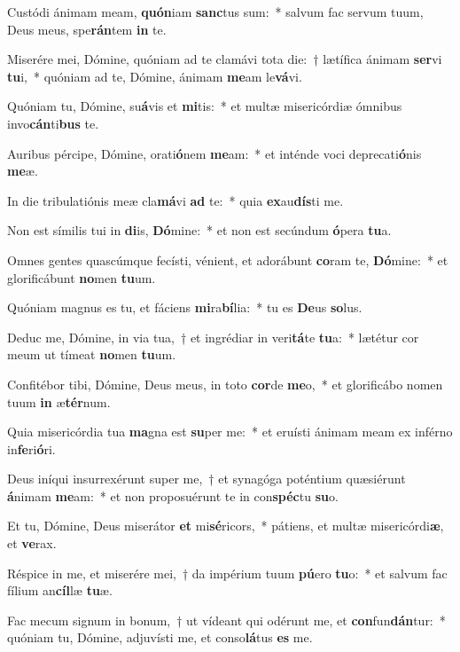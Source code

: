 \item Custódi ánimam meam, \textbf{quón}iam \textbf{sanc}tus sum:~* salvum fac servum tuum, Deus meus, spe\textbf{rán}tem \textbf{in} te.
\item Miserére mei, Dómine, quóniam ad te clamávi tota die:~† lætífica ánimam \textbf{ser}vi \textbf{tu}i,~* quóniam ad te, Dómine, ánimam \textbf{me}am le\textbf{vá}vi.
\item Quóniam tu, Dómine, su\textbf{á}vis et \textbf{mi}tis:~* et multæ misericórdiæ ómnibus invo\textbf{cán}ti\textbf{bus} te.
\item Auribus pércipe, Dómine, orati\textbf{ó}nem \textbf{me}am:~* et inténde voci deprecati\textbf{ó}nis \textbf{me}æ.
\item In die tribulatiónis meæ cla\textbf{má}vi \textbf{ad} te:~* quia \textbf{ex}au\textbf{dís}ti me.
\item Non est símilis tui in \textbf{di}is, \textbf{Dó}mine:~* et non est secúndum \textbf{ó}pera \textbf{tu}a.
\item Omnes gentes quascúmque fecísti, vénient, et adorábunt \textbf{co}ram te, \textbf{Dó}mine:~* et glorificábunt \textbf{no}men \textbf{tu}um.
\item Quóniam magnus es tu, et fáciens \textbf{mi}ra\textbf{bí}lia:~* tu es \textbf{De}us \textbf{so}lus.
\item Deduc me, Dómine, in via tua,~† et ingrédiar in veri\textbf{tá}te \textbf{tu}a:~* lætétur cor meum ut tímeat \textbf{no}men \textbf{tu}um.
\item Confitébor tibi, Dómine, Deus meus, in toto \textbf{cor}de \textbf{me}o,~* et glorificábo nomen tuum \textbf{in} æ\textbf{tér}num.
\item Quia misericórdia tua \textbf{ma}gna est \textbf{su}per me:~* et eruísti ánimam meam ex inférno in\textbf{fe}ri\textbf{ó}ri.
\item Deus iníqui insurrexérunt super me,~† et synagóga poténtium quæsiérunt \textbf{á}nimam \textbf{me}am:~* et non proposuérunt te in con\textbf{spéc}tu \textbf{su}o.
\item Et tu, Dómine, Deus miserátor \textbf{et} mi\textbf{sé}ricors,~* pátiens, et multæ misericórdi\textbf{æ}, et \textbf{ve}rax.
\item Réspice in me, et miserére mei,~† da impérium tuum \textbf{pú}ero \textbf{tu}o:~* et salvum fac fílium an\textbf{cíl}læ \textbf{tu}æ.
\item Fac mecum signum in bonum,~† ut vídeant qui odérunt me, et \textbf{con}fun\textbf{dán}tur:~* quóniam tu, Dómine, adjuvísti me, et conso\textbf{lá}tus \textbf{es} me.
